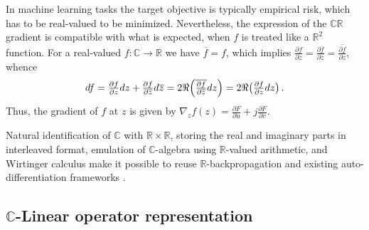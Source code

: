 \documentclass[a4paper,10pt]{article}
\newcommand{\real}{\mathbb{R}}
\newcommand{\cplx}{\mathbb{C}}
\newcommand{\conj}[1]{\overline{#1}}
\begin{document}

In machine learning tasks the target objective is typically empirical risk, which has to
be real-valued to be minimized. Nevertheless, the expression of the $\cplx\real$ gradient
is compatible with what is expected, when $f$ is treated like a $\real^2$ function. For a
real-valued $f\colon \cplx \to \real$ we have $\conj{f} = f$, which implies $
  \tfrac{\partial f}{\partial \conj{z}}
    = \tfrac{\partial \conj{f}}{\partial \conj{z}}
    = \conj{\tfrac{\partial f}{\partial z}}
$, whence
$$
df
  = \tfrac{\partial f}{\partial z} dz
    + \tfrac{\partial f}{\partial \conj{z}} d\conj{z}
  = 2 \Re \Bigl(
    \conj{\tfrac{\partial f}{\partial \conj{z}}} dz
  \Bigr)
  = 2 \Re \bigl(
    \tfrac{\partial f}{\partial z} dz
  \bigr)
  \,. $$
Thus, the gradient of $f$ at $z$ is given by $
  \nabla_z f(z)
    = \tfrac{\partial F}{\partial u}
      + j \tfrac{\partial F}{\partial v}
$.

Natural identification of $\cplx$ with $\real\times \real$, storing the real and imaginary
parts in interleaved format, emulation of $\cplx$-algebra using $\real$-valued arithmetic,
and Wirtinger calculus make it possible to reuse $\real$-backpropagation and existing
auto-differentiation frameworks \citep{trabelsi_deep_2017}.


\subsection{$\cplx$-Linear operator representation} %
\label{sub:c-linear_operator_representation}
\end{document}
